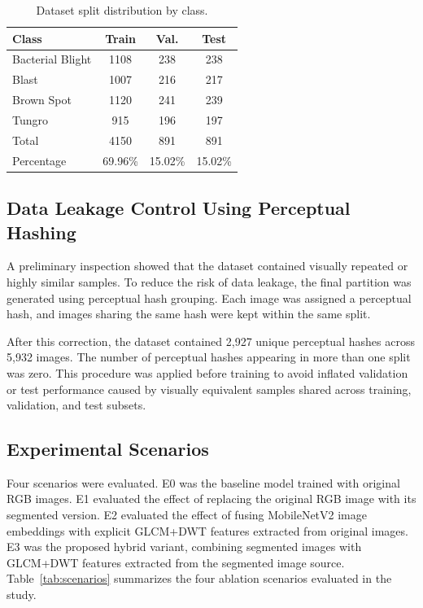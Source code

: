\begin{table}[t]
\caption{Dataset split distribution by class.}
\label{tab:split_distribution}
\centering
\footnotesize
\setlength{\tabcolsep}{4pt}
\begin{tabular}{lccc}
\toprule
Class & Train & Val. & Test \\
\midrule
Bacterial Blight & 1108 & 238 & 238 \\
Blast            & 1007 & 216 & 217 \\
Brown Spot       & 1120 & 241 & 239 \\
Tungro           & 915  & 196 & 197 \\
\midrule
Total            & 4150 & 891 & 891 \\
Percentage       & 69.96\% & 15.02\% & 15.02\% \\
\bottomrule
\end{tabular}
\end{table}

\subsection{Data Leakage Control Using Perceptual Hashing}

A preliminary inspection showed that the dataset contained visually repeated or highly similar samples. To reduce the risk of data leakage, the final partition was generated using perceptual hash grouping. Each image was assigned a perceptual hash, and images sharing the same hash were kept within the same split.

After this correction, the dataset contained 2,927 unique perceptual hashes across 5,932 images. The number of perceptual hashes appearing in more than one split was zero. This procedure was applied before training to avoid inflated validation or test performance caused by visually equivalent samples shared across training, validation, and test subsets.

\subsection{Experimental Scenarios}

Four scenarios were evaluated. E0 was the baseline model trained with original RGB images. E1 evaluated the effect of replacing the original RGB image with its segmented version. E2 evaluated the effect of fusing MobileNetV2 image embeddings with explicit GLCM+DWT features extracted from original images. E3 was the proposed hybrid variant, combining segmented images with GLCM+DWT features extracted from the segmented image source. Table~\ref{tab:scenarios} summarizes the four ablation scenarios evaluated in the study.

